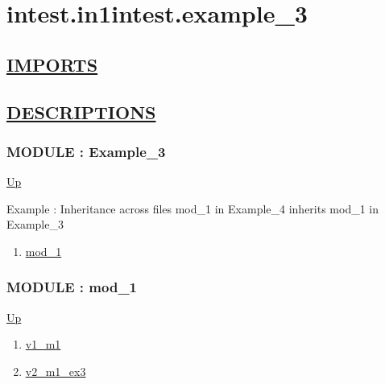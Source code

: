 \chapter*{intest.in1intest.example\_3}
\hypertarget{ecldoc:toc:intest.in1intest.example_3}{}

\section*{\underline{IMPORTS}}

\section*{\underline{DESCRIPTIONS}}
\subsection*{MODULE : Example\_3}
\hypertarget{ecldoc:intest.in1intest.Example_3}{}
\par
\begin{minipage}[t]{\textwidth}
\begin{flushleft}
  
\end{flushleft}
\end{minipage}
\hyperlink{ecldoc:toc:intest/in1intest}{Up} \\
\par
Example : Inheritance across files mod\_1 in Example\_4 inherits mod\_1 in Example\_3 \\
\par
\begin{enumerate}
\item \hyperlink{ecldoc:intest.in1intest.Example_3.mod_1}{mod\_1}
\end{enumerate}
\subsection*{MODULE : mod\_1}
\hypertarget{ecldoc:intest.in1intest.Example_3.mod_1}{}
\par
\begin{minipage}[t]{\textwidth}
\begin{flushleft}
  
\end{flushleft}
\end{minipage}
\hyperlink{ecldoc:intest.in1intest.Example_3}{Up} \\
\par
\par
\begin{enumerate}
\item \hyperlink{ecldoc:intest.in1intest.example_3.mod_1.v1_m1}{v1\_m1}
\item \hyperlink{ecldoc:intest.in1intest.example_3.mod_1.v2_m1_ex3}{v2\_m1\_ex3}
\end{enumerate}
